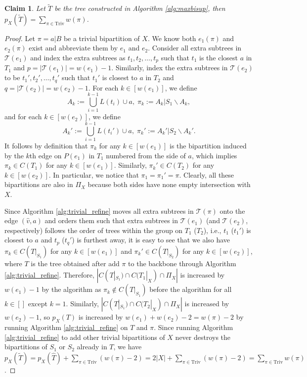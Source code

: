 \documentclass{bmcart}
\newcommand{\triv}{\mathrm{Triv}}
\newtheorem{claim}{Claim}
\begin{document}
\begin{claim}\label{claim:after_add_trivial}
    Let $\tilde{T}$ be the tree constructed in Algorithm \ref{alg:maxbisup}, then $p_X(\tilde{T}) = \sum_{\pi \in \triv} w(\pi)$. 
\end{claim}
\begin{proof}
    Let $\pi = a|B$ be a trivial bipartition of $X$. We know both $e_1(\pi)$ and $e_2(\pi)$ exist and abbreviate them by $e_1$ and $e_2$. Consider all extra subtrees in $\mathcal{T}(e_1)$ and index the extra subtrees as $t_1, t_2, \dots, t_p$ such that $t_1$ is the closest $a$ in $T_1$ and $p = |\mathcal{T}(e_1)| = w(e_1)-1$. Similarly, index the extra subtrees in $\mathcal{T}(e_2)$ to be $t_1', t_2', \dots, t_q'$ such that $t_1'$ is closest to $a$ in $T_2$ and $q = |\mathcal{T}(e_2)| = w(e_2)-1$. For each $k \in [w(e_1)]$, we define
    \[A_k := \bigcup_{i = 1}^{k-1} L(t_i) \cup a, \; \pi_k := A_k | S_1 \backslash A_k,\]
    and for each $k \in [w(e_2)]$, we define
    \[A_k' := \bigcup_{i = 1}^{k-1} L(t_i') \cup a,\; \pi_k' := A_k' | S_2 \backslash A_k'.\]
    It follows by definition that $\pi_k$ for any $k \in [w(e_1)]$ is the bipartition induced by the $k$th edge on $P(e_1)$ in $T_1$ numbered from the side of $a$, which implies $\pi_k \in C(T_1)$ for any $k \in [w(e_1)]$. Similarly, $\pi_k' \in C(T_2)$ for any $k\in[w(e_2)]$. In particular, we notice that $\pi_1 = \pi_1' = \pi$. Clearly, all these bipartitions are also in $\Pi_X$ because both sides have none empty intersection with $X$.

    Since Algorithm \ref{alg:trivial_refine} moves all extra subtrees in $\mathcal{T}(\pi)$ onto the edge $(\hat{v},a)$ and orders them such that extra subtrees in $\mathcal{T}(e_1)$ (and $\mathcal{T}(e_2)$, respectively) follows the order of trees within the group on $T_1$ ($T_2$), i.e., $t_1$ ($t_1'$) is closest to $a$ and $t_p$ ($t_q'$) is furthest away, it is easy to see that we also have $\pi_k \in C(T|_{S_1})$ for any $k \in [w(e_1)]$ and $\pi_k' \in C(T|_{S_2})$ for any $k \in [w(e_2)]$, where $T$ is the tree obtained after add $\pi$ to the backbone through Algorithm \ref{alg:trivial_refine}. Therefore, $|C(T|_{S_1}) \cap C(T_1|_X) \cap \Pi_X|$ is increased by $w(e_1)-1$ by the algorithm as $\pi_k \notin C(T|_{S_1})$ before the algorithm for all $k \in []$ except $k=1$. Similarly, $|C(T|_{S_1}) \cap C(T_2|_X) \cap \Pi_X|$ is increased by $w(e_2)-1$, so $p_X(T)$ is increased by $w(e_1)+w(e_2)-2 = w(\pi)-2$ by running Algorithm \ref{alg:trivial_refine} on $T$ and $\pi$. Since running Algorithm \ref{alg:trivial_refine} to add other trivial bipartitions of $X$ never destroys the bipartitions of $S_1$ or $S_2$ already in $T$, we have $p_X(\tilde{T}) = p_X(\hat{T}) + \sum_{\pi \in \triv} (w(\pi) -2) = 2|X| + \sum_{\pi \in \triv} (w(\pi) - 2) = \sum_{\pi \in \triv} w(\pi)$.
\end{proof}
\end{document}
